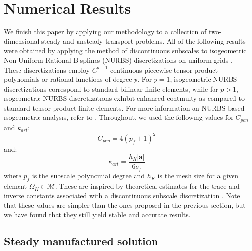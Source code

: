 \documentclass[11pt]{article}
\begin{document}
\section{Numerical Results}

We finish this paper by applying our methodology to a collection of two-dimensional steady and unsteady transport problems.  All of the following results were obtained by applying the method of discontinuous subscales to isogeometric Non-Uniform Rational B-splines (NURBS) discretizations on uniform grids \cite{Hughes05}.  These discretizations employ $C^{p-1}$-continuous piecewise tensor-product polynomials or rational functions of degree $p$.  For $p = 1$, isogeometric NURBS discretizations correspond to standard bilinear finite elements, while for $p > 1$, isogeometric NURBS discretizations exhibit enhanced continuity as compared to standard tensor-product finite elements.  For more information on NURBS-based isogeometric analysis, refer to \cite{Cottrell09}.  Throughout, we used the following values for $C_{pen}$ and $\kappa_{art}$:
\begin{equation}\label{eq:C_ideal}
C_{pen} = 4\left( p_f + 1 \right)^2
\end{equation}
and:
\begin{equation}\label{eq:kart_ideal}
\kappa_{art} = \frac{h_K \left| \bm{a} \right|}{6 p_f}
\end{equation}
where $p_f$ is the subscale polynomial degree and $h_K$ is the mesh size for a given element $\Omega_K \in \mathcal{M}$.  These are inspired by theoretical estimates for the trace and inverse constants associated with a discontinuous subscale discretization \cite{Harari92,Warburton03}. Note that these values are simpler than the ones proposed in the previous section, but we have found that they still yield stable and accurate results.

\subsection{Steady manufactured solution}
\end{document}
